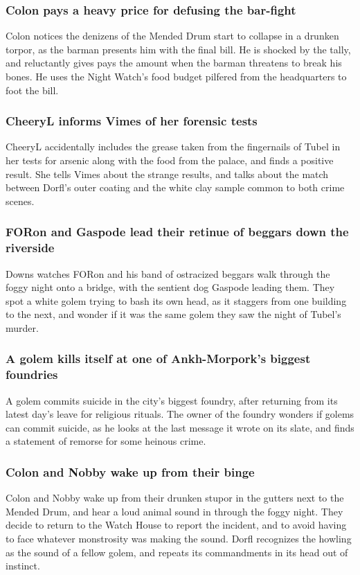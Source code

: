 \subsubsection{\Gls{Colon} pays a heavy price for defusing the bar-fight}
\Gls{Colon} notices the denizens of the Mended Drum start to collapse in a drunken torpor, as the
barman presents him with the final bill. He is shocked by the tally, and reluctantly gives pays the
amount when the barman threatens to break his bones. He uses the Night Watch's food budget pilfered
from the headquarters to foot the bill.

\subsubsection{\Gls{CheeryL} informs \Gls{Vimes} of her forensic tests}
\Gls{CheeryL} accidentally includes the grease taken from the fingernails of \Gls{Tubel} in her
tests for arsenic along with the food from the palace, and finds a positive result. She tells
\Gls{Vimes} about the strange results, and talks about the match between \Gls{Dorfl}'s outer coating
and the white clay sample common to both crime scenes.

\subsubsection{\Gls{FORon} and \Gls{Gaspode} lead their retinue of beggars down the riverside}
\Gls{Downs} watches \Gls{FORon} and his band of ostracized beggars walk through the foggy night onto
a bridge, with the sentient dog \Gls{Gaspode} leading them. They spot a white golem trying to bash
its own head, as it staggers from one building to the next, and wonder if it was the same golem
they saw the night of \Gls{Tubel}'s murder.

\subsubsection{A golem kills itself at one of Ankh-Morpork's biggest foundries}
A golem commits suicide in the city's biggest foundry, after returning from its latest day's leave
for religious rituals. The owner of the foundry wonders if golems can commit suicide, as he looks
at the last message it wrote on its slate, and finds a statement of remorse for some heinous crime.

\subsubsection{\Gls{Colon} and \Gls{Nobby} wake up from their binge}
\Gls{Colon} and \Gls{Nobby} wake up from their drunken stupor in the gutters next to the Mended
Drum, and hear a loud animal sound in through the foggy night. They decide to return to the Watch
House to report the incident, and to avoid having to face whatever monstrosity was making the sound.
\Gls{Dorfl} recognizes the howling as the sound of a fellow golem, and repeats its commandments in
its head out of instinct.

